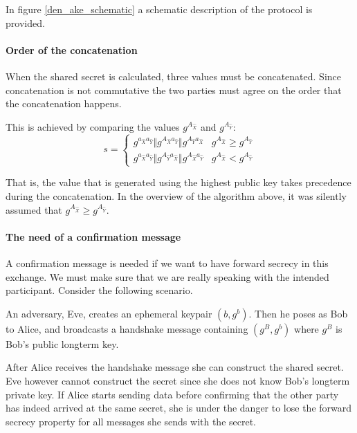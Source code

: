 In figure \ref{den_ake_schematic} a schematic description of the protocol is provided.

\paragraph{Order of the concatenation}
When the shared secret is calculated, three values must be concatenated. Since
concatenation is not commutative the two parties must agree on the order that the
concatenation happens.

This is achieved by comparing the values $g^{A_{\hat{X}}}$ and $g^{A_{\hat{Y}}}$:
\begin{equation*}
  s =
  \begin{cases}
    g^{a_{\hat{X}}a_{\hat{Y}}} \Vert g^{A_{\hat{X}}a_{\hat{Y}}} \Vert g^{A_{\hat{Y}}a_{\hat{X}}} & \text{$g^{A_{\hat{X}}} \geq g^{A_{\hat{Y}}}$}\\

    g^{a_{\hat{X}}a_{\hat{Y}}} \Vert g^{A_{\hat{Y}}a_{\hat{X}}} \Vert g^{A_{\hat{X}}a_{\hat{Y}}} &\text{$g^{A_{\hat{X}}} < g^{A_{\hat{Y}}}$}

  \end{cases}
\end{equation*}

That is, the value that is generated using the highest public key takes precedence during the
concatenation. In the overview of the algorithm above, it was silently assumed that $g^{A_{\hat{X}}} \geq g^{A_{\hat{Y}}}$.

\paragraph{The need of a confirmation message}
\label{confirm_message_explain}
A confirmation message is needed if we want to have forward secrecy in this exchange.
We must make sure that we are really speaking with the intended participant. Consider
the following scenario.

An adversary, Eve, creates an ephemeral keypair $(b, g^b)$. Then he poses as Bob to Alice,
and broadcasts a handshake message containing $(g^B,g^b)$ where $g^B$ is Bob's
public longterm key.

After Alice receives the handshake message she can construct the shared secret. Eve
however cannot construct the secret since she does not know Bob's longterm
private key. If Alice starts sending data before confirming that the other party
has indeed arrived at the same secret, she is under the danger to lose the forward
secrecy property for all messages she sends with the secret.

